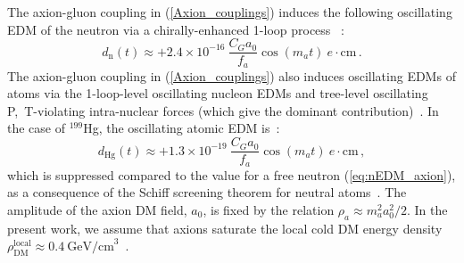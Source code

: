 The axion-gluon coupling in (\ref{Axion_couplings}) induces the following oscillating EDM of the neutron via a chirally-enhanced 1-loop process~%
\cite{tuningfootnote,Witten1979,Witten1979B,Pospelov1999}:
\begin{equation}
\label{eq:nEDM_axion}
d_\mathrm{n}(t) \approx +2.4 \times 10^{-16} ~ \frac{C_G a_0}{f_a} \cos(m_a t) ~ e \cdot \textrm{cm} \, .
\end{equation}
The axion-gluon coupling in (\ref{Axion_couplings}) also induces oscillating EDMs of atoms via the 1-loop-level oscillating nucleon EDMs and tree-level oscillating P,~T-violating intra-nuclear forces (which give the dominant contribution)~\cite{Stadnik2014A,Flambaum1984EDM,Flambaum1984EDMB}.
In the case of $^{199}$Hg, the oscillating atomic EDM is~\cite{Stadnik2014A,StadnikThesis,Flambaum1985EDM,Flambaum1985EDMB,Flambaum2002EDM,Dmitriev2003A,Dmitriev2003B,Dmitriev2005,Engel2005,Engel2010}:
\begin{equation}
\label{199Hg-EDM_axion}
d_{\textrm{Hg}}(t) \approx +1.3 \times 10^{-19} ~ \frac{C_G a_0}{f_a} \cos(m_a t) ~ e \cdot \textrm{cm} \, ,
\end{equation}
which is suppressed compared to the value for a free neutron (\ref{eq:nEDM_axion}), as a consequence of the Schiff screening theorem for neutral atoms~\cite{Schiff1963}.
The amplitude of the axion DM field, $a_0$, is fixed by the relation $\rho_a \approx m_a^2 a_0^2 /2$.
In the present work, we assume that axions saturate the local cold DM energy density $\rho_{\mathrm{DM}}^{\mathrm{local}} \approx 0.4~\textrm{GeV/cm}^3$~\cite{Catena2010}.






